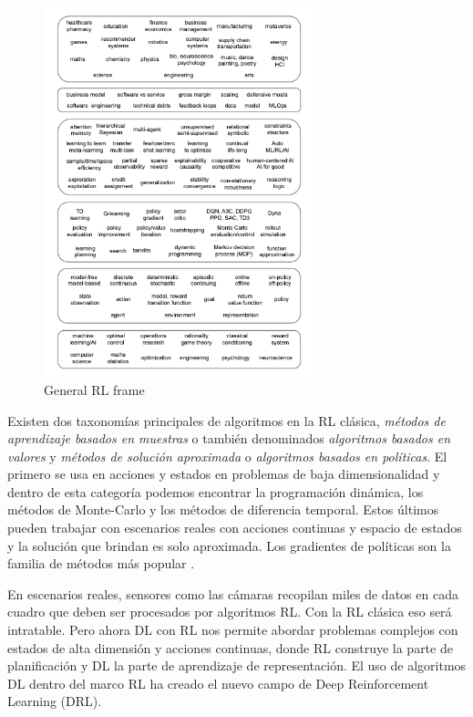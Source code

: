 \documentclass{svproc}
\begin{document}
\begin{figure}[ht]
    \centering
    \includegraphics[width=0.7\textwidth]{figures/RL-general.png}
    \caption{General RL frame }
    \label{fig:RL total vision}
\end{figure}


Existen dos taxonomías principales de algoritmos en la RL clásica, \emph{métodos de aprendizaje basados en muestras} o también denominados \textit{algoritmos basados en valores} y \textit{métodos de solución aproximada} o \textit{algoritmos basados en políticas}. El primero se usa en acciones y estados en problemas de baja dimensionalidad y dentro de esta categoría podemos encontrar la programación dinámica, los métodos de Monte-Carlo y los métodos de diferencia temporal. Estos últimos pueden trabajar con escenarios reales con acciones continuas y espacio de estados y la solución que brindan es solo aproximada. Los gradientes de políticas son la familia de métodos más popular \cite{sutton2018reinforcement}.

En escenarios reales, sensores como las cámaras recopilan miles de datos en cada cuadro que deben ser procesados ​​por algoritmos RL. Con la RL clásica eso será intratable. Pero ahora DL con RL nos permite abordar problemas complejos con estados de alta dimensión y acciones continuas, donde RL construye la parte de planificación y DL la parte de aprendizaje de representación. El uso de algoritmos DL dentro del marco RL ha creado el nuevo campo de Deep Reinforcement Learning (DRL).
\end{document}

